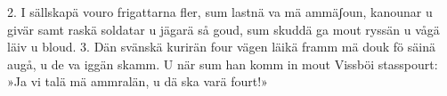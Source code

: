 2.  I sällskapä vouro frigattarna fler,
    sum lastnä va mä ammäʃoun, kanounar u givär
    samt raskä soldatar u jägarä så goud,
    sum skuddä ga mout ryssän u vågä läiv u bloud.
3.  Dän svänskä kurirän four vägen läikä framm
    mä douk fö säinä augå, u de va iggän skamm.
    U när sum han komm in mout Vissböi stasspourt:
    »Ja vi talä mä ammralän, u dä ska varä fourt!»
